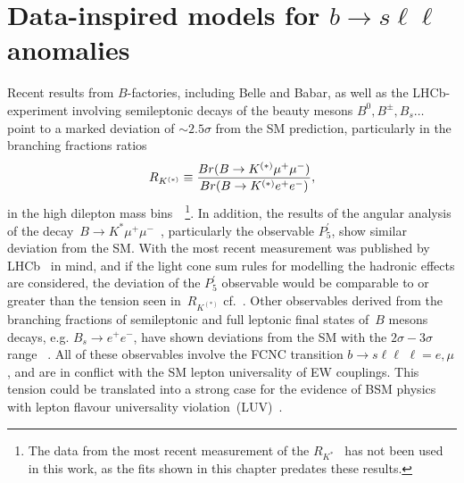 
\chapter{Data-inspired models for $b \to s \ell \ell$ anomalies}\label{chap:flav}
Recent results from $B$-factories, including Belle and Babar, as well as the LHCb-experiment involving semileptonic decays of the beauty mesons $B^0, B^\pm, B_s \dots$ point to a marked deviation of $ \sim 2.5 \sigma$ from the SM prediction, particularly in the branching fractions ratios
\begin{equation}
	R_{K^{(*)}} \equiv {Br(B \to K^{(*)} \mu^{+} \mu^{-}) \over Br(B \to K^{(*)} e^{+} e^{-})},
\end{equation}
in the high dilepton mass bins~\cite{Aaij:2014ora,Aaij:2017vbb,Aaij:2019wad,Abdesselam:2019wac,LHCb:2021trn}~\footnote{The data from the most recent measurement of the $R_{K^*}$~\cite{LHCb:2021trn} has not been used in this work, as the fits shown in this chapter predates these results.}. In addition, the results of the angular analysis of the decay~$B \to K^{*} \mu^{+} \mu^{-}$~\cite{Descotes-Genon:2013wba,Descotes-Genon:2015uva}, particularly the observable $P_5^\prime$,  show similar deviation from the SM. With the most recent measurement was published by LHCb~\cite{LHCb:2020lmf} in mind, and if the light cone sum rules for modelling the hadronic effects are considered, the deviation of the $P_5^\prime$ observable would be comparable to or greater than the tension seen in~$R_{K^{(*)}}$ cf.~\cite{Ciuchini:2018anp,Hurth:2020rzx}. Other observables derived from the branching fractions of semileptonic and full leptonic final states of~$B$ mesons decays, e.g. $ B_{s} \to e^{+} e^{-}$, have shown deviations from the SM with the $2\sigma-3\sigma$ range ~\cite{Chatrchyan:2013bka,Aaij:2017vad,Aaboud:2018mst,Aaij:2020nol}. All of these observables involve
 the FCNC transition $ b \to s \ell \ell\, \, \ell = e, \mu$, and are in conflict with the SM lepton universality of EW couplings. This tension could be translated into a strong case for the evidence of BSM physics with lepton flavour universality violation~(LUV)~\cite{Hiller:2014yaa,Hiller:2014ula,Bordone:2016gaq}.\\

